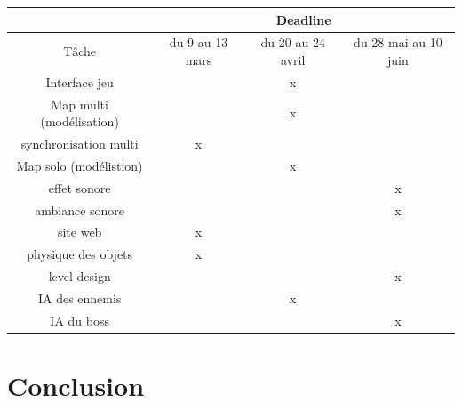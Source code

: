 \documentclass[12pt]{report}
\begin{document}
	\begin{tabular}{|*{4}{c|}}
	\hline
	& \multicolumn{3}{|c|}{Deadline}\\
	\hline
	Tâche & du 9 au 13 mars & du 20 au 24 avril & du 28 mai au 10 juin \\
	\hline
	Interface jeu & & x & \\
	\hline
	Map multi (modélisation) & & x & \\
	\hline
	synchronisation multi & x & & \\
	\hline
	Map solo (modélistion) & & x & \\
	\hline
	effet sonore & & & x \\
	\hline
	ambiance sonore & & & x \\
	\hline
	site web & x & & \\
	\hline 
	physique des objets & x & & \\
	\hline 
	level design & & & x \\
	\hline 
	IA des ennemis & & x & \\
	\hline
	IA du boss & & & x \\
	\hline
	
	\end{tabular}
\chapter{Conclusion}
\end{document}
